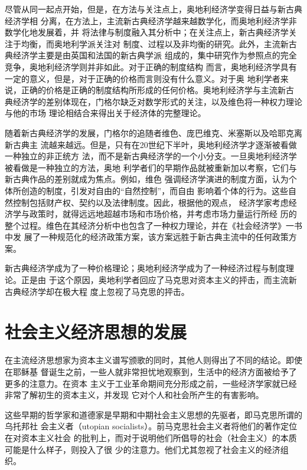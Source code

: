 尽管从同一起点开始，但是，在方法与关注点上，奥地利经济学变得日益与新古典经济学相
分离，在方法上，主流新古典经济学越来越数学化，而奥地利经济学非数学化地发展着，并
将法律与制度融入其分析中；在关注点上，新古典经济学关注于均衡，而奥地利学派关注对
制度、过程以及非均衡的研究。此外，主流新古典经济学主要是由英国和法国的新古典学派
组成的，集中研究作为参照点的完全竞争，奥地利经济学则并非如此。对于正确的制度结构
而言，奥地利经济学具有一定的意义，但是，对于正确的价格而言则没有什么意义。对于奥
地利学者来说，正确的价格是正确的制度结构所形成的任何价格。奥地利经济学与主流新古
典经济学的差别体现在，门格尔缺乏对数学形式的关注，以及维色将一种权力理论与他的市场
理论相结合来得出关于经济体的完整理论。

随着新古典经济学的发展，门格尔的追随者维色、庞巴维克、米塞斯以及哈耶克离新古典主
流越来越远。但是，只有在20世纪下半叶，奥地利经济学才逐渐被看做一种独立的非正统方
法，而不是新古典经济学的一个小分支。一旦奥地利经济学被看做是一种独立的方法，奥地
利学者们的早期作品就被重新加以考察，它们与新古典作品的差别就成为焦点。例如，维色
强调经济学演进的制度方面，认为个体所创造的制度，引发对自由的“自然控制”，而自由
影响着个体的行为。这些自然控制包括财产权、契约以及法律制度。因此，根据他的观点，
经济学家考虑经济学与政策时，就得远远地超越市场和市场价格，并考虑市场力量运行所经
历的整个过程。维色在其经济分析中也包含了一种权力理论，并在《社会经济学》一书中发
展了一种规范化的经济政策方案，该方案远胜于新古典主流中的任何政策方案。

新古典经济学成为了一种价格理论；奥地利经济学成为了一种经济过程与制度理论。正是由
于这个原因，奥地利学者回应了马克思对资本主义的抨击，而主流新古典经济学却在极大程
度上忽视了马克思的抨击。

\section{社会主义经济思想的发展}

在主流经济思想家为资本主义谱写颁歌的同时，其他人则得出了不同的结论。即使在耶稣基
督诞生之前，一些人就非常担忧地观察到，生活中的经济方面被给予了更多的注意力。在资本
主义于工业革命期间充分形成之前，一些经济学家就已经非常了解初生的资本主义，并发现
它对个人和社会所产生的有害影响。

这些早期的哲学家和道德家是早期和中期社会主义思想的先驱者，即马克思所谓的乌托邦社
会主义者（utopian socialists）。前马克思社会主义者将他们的著作定位在对资本主义社会
的批判上，而对于说明他们所倡导的社会（社会主义）的本质可能是什么样子，则投入了很
少的注意力。他们尤其忽视了社会主义的经济组织。

